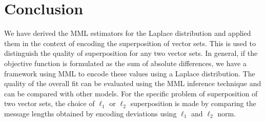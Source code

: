 \documentclass[wcp]{jmlr}
\begin{document}
\section{Conclusion}
We have derived the MML estimators for the Laplace distribution and applied them
in the context of encoding the superposition of vector sets. This is used to
distinguish the quality of superposition for any two vector sets. 
In general, if the objective function is formulated as the sum of absolute differences,
we have a framework using MML to encode these values using 
a Laplace distribution. The quality of the overall fit can be evaluated using the
MML inference technique and can be compared with other models.
For the specific problem of superposition of two vector sets, the choice of $\ell_1$ or $\ell_2$
superposition is made by comparing the message lengths obtained by encoding deviations
using $\ell_1$ and $\ell_2$ norm.




\appendix
\end{document}

